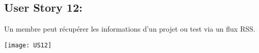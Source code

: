 \newpage{}
\subsection{User Story 12:}
Un membre peut récupérer les informations d'un projet ou test via un flux RSS.

  \begin{center}
        \texttt{[image: US12]}
  \end{center}